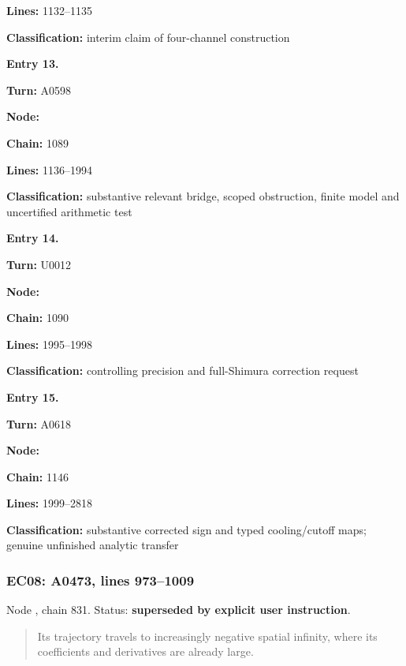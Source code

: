 \documentclass[10pt,a4paper,oneside]{report}
\begin{document}
\textbf{Lines:} 1132--1135

\textbf{Classification:} interim claim of four-channel construction


\textbf{Entry 13.}

\textbf{Turn:} A0598

\textbf{Node:} \protect{}

\textbf{Chain:} 1089

\textbf{Lines:} 1136--1994

\textbf{Classification:} substantive relevant bridge, scoped
obstruction, finite model and uncertified arithmetic test


\textbf{Entry 14.}

\textbf{Turn:} U0012

\textbf{Node:} \protect{}

\textbf{Chain:} 1090

\textbf{Lines:} 1995--1998

\textbf{Classification:} controlling precision and full-Shimura
correction request


\textbf{Entry 15.}

\textbf{Turn:} A0618

\textbf{Node:} \protect{}

\textbf{Chain:} 1146

\textbf{Lines:} 1999--2818

\textbf{Classification:} substantive corrected sign and typed
cooling/cutoff maps; genuine unfinished analytic transfer

\subsubsection{EC08: A0473, lines
973--1009}\label{ec08-a0473-lines-9731009}

Node \protect{}, chain 831.
Status: \textbf{superseded by explicit user instruction}.

\begin{quote}
Its trajectory travels to increasingly negative spatial infinity, where
its coefficients and derivatives are already large.
\end{quote}
\end{document}
